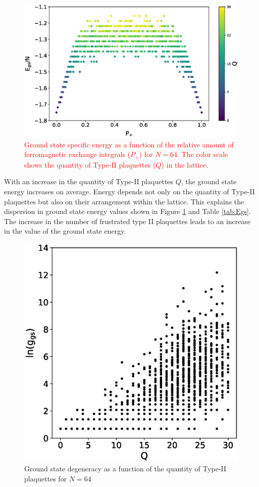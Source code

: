 \documentclass[preprint,12pt]{elsarticle}
\begin{document}
\begin{figure}[H]
	\centering
		\includegraphics[width=1.0\linewidth]{pictures/E_P_Q.eps}
	\caption{\textcolor{red}{Ground state specific energy as a function of the relative amount of ferromagnetic exchange integrals ($P_+$) for $N=64$. The color scale shows the quantity of Type-II plaquettes ($Q$) in the lattice.}}
	\label{fig:E(Q)}
\end{figure}

With an increase in the quantity of Type-II plaquettes $Q$, the ground state energy increases on average. Energy depends not only on the quantity of Type-II plaquettes but also on their arrangement within the lattice. This explains the dispersion in ground state energy values shown in Figure \ref{fig:E(Q)} and Table \ref{tab:Egs}. The increase in the number of frustrated type II plaquettes leads to an increase in the value of the ground state energy.


\begin{figure}[H]
	\centering
	\includegraphics[width=0.5\linewidth]{pictures/g_Q.eps}
	\caption{Ground state degeneracy as a function of the quantity of Type-II plaquettes for $N=64$}
	\label{fig:g(Q)}
\end{figure}
\end{document}
